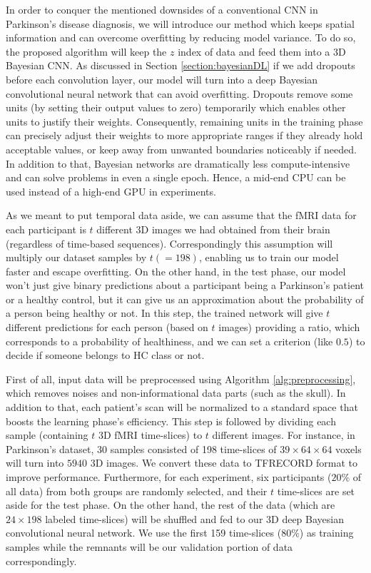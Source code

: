 \documentclass[preprint,12pt]{elsarticle}
\begin{document}
In order to conquer the mentioned downsides of a conventional CNN in Parkinson's disease diagnosis, we will introduce our method which keeps spatial information and can overcome overfitting by reducing model variance. To do so, the proposed algorithm will keep the $z$ index of data and feed them into a 3D Bayesian CNN. As discussed in Section \ref{section:bayesianDL} if we add dropouts before each convolution layer, our model will turn into a deep Bayesian convolutional neural network that can avoid overfitting. Dropouts remove some units (by setting their output values to zero) temporarily which enables other units to justify their weights. Consequently, remaining units in the training phase can precisely adjust their weights to more appropriate ranges if they already hold acceptable values, or keep away from unwanted boundaries noticeably if needed. In addition to that, Bayesian networks are dramatically less compute-intensive and can solve problems in even a single epoch. Hence, a mid-end CPU can be used instead of a high-end GPU in experiments.

As we meant to put temporal data aside, we can assume that the fMRI data for each participant is $t$ different 3D images we had obtained from their brain (regardless of time-based sequences). Correspondingly this assumption will multiply our dataset samples by $t (=198)$, enabling us to train our model faster and escape overfitting. On the other hand, in the test phase, our model won't just give binary predictions about a participant being a Parkinson's patient or a healthy control, but it can give us an approximation about the probability of a person being healthy or not. In this step, the trained network will give $t$ different predictions for each person (based on $t$ images) providing a ratio, which corresponds to a probability of healthiness, and we can set a criterion (like $0.5$) to decide if someone belongs to HC class or not.


First of all, input data will be preprocessed using Algorithm \ref{alg:preprocessing}, which removes noises and non-informational data parts (such as the skull). In addition to that, each patient's scan will be normalized to a standard space that boosts the learning phase's efficiency. This step is followed by dividing each sample (containing $t$ 3D fMRI time-slices) to $t$ different images. For instance, in Parkinson's dataset, 30 samples consisted of 198 time-slices of \texttt{$39 \times 64 \times 64$} voxels will turn into $5940$ 3D images. We convert these data to TFRECORD format to improve performance. Furthermore, for each experiment, six participants ($20\%$ of all data) from both groups are randomly selected, and their $t$ time-slices are set aside for the test phase. On the other hand, the rest of the data (which are $24 \times 198$ labeled time-slices) will be shuffled and fed to our 3D deep Bayesian convolutional neural network. We use the first 159 time-slices ($80\%$) as training samples while the remnants will be our validation portion of data correspondingly. 
\end{document}
